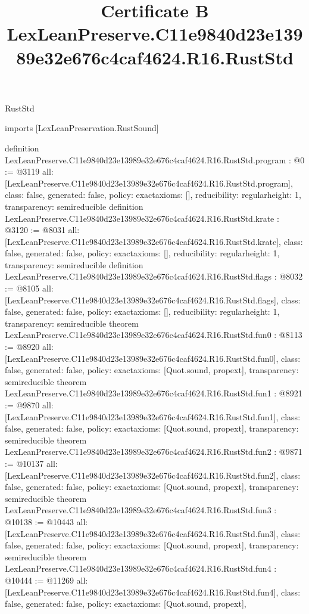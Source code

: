 \begin{lexlean}{RustStd}
\title{Certificate B LexLeanPreserve.C11e9840d23e13989e32e676c4caf4624.R16.RustStd}
\begin{coremodule}
imports [LexLeanPreservation.RustSound]

definition LexLeanPreserve.C11e9840d23e13989e32e676c4caf4624.R16.RustStd.program : @0 := @3119 {
  all: [LexLeanPreserve.C11e9840d23e13989e32e676c4caf4624.R16.RustStd.program],
  class: false,
  generated: false,
  policy: exact{axioms: []},
  reducibility: regular{height: 1},
  transparency: semireducible
}
definition LexLeanPreserve.C11e9840d23e13989e32e676c4caf4624.R16.RustStd.krate : @3120 := @8031 {
  all: [LexLeanPreserve.C11e9840d23e13989e32e676c4caf4624.R16.RustStd.krate],
  class: false,
  generated: false,
  policy: exact{axioms: []},
  reducibility: regular{height: 1},
  transparency: semireducible
}
definition LexLeanPreserve.C11e9840d23e13989e32e676c4caf4624.R16.RustStd.flags : @8032 := @8105 {
  all: [LexLeanPreserve.C11e9840d23e13989e32e676c4caf4624.R16.RustStd.flags],
  class: false,
  generated: false,
  policy: exact{axioms: []},
  reducibility: regular{height: 1},
  transparency: semireducible
}
theorem LexLeanPreserve.C11e9840d23e13989e32e676c4caf4624.R16.RustStd.fun0 : @8113 := @8920 {
  all: [LexLeanPreserve.C11e9840d23e13989e32e676c4caf4624.R16.RustStd.fun0],
  class: false,
  generated: false,
  policy: exact{axioms: [Quot.sound, propext]},
  transparency: semireducible
}
theorem LexLeanPreserve.C11e9840d23e13989e32e676c4caf4624.R16.RustStd.fun1 : @8921 := @9870 {
  all: [LexLeanPreserve.C11e9840d23e13989e32e676c4caf4624.R16.RustStd.fun1],
  class: false,
  generated: false,
  policy: exact{axioms: [Quot.sound, propext]},
  transparency: semireducible
}
theorem LexLeanPreserve.C11e9840d23e13989e32e676c4caf4624.R16.RustStd.fun2 : @9871 := @10137 {
  all: [LexLeanPreserve.C11e9840d23e13989e32e676c4caf4624.R16.RustStd.fun2],
  class: false,
  generated: false,
  policy: exact{axioms: [Quot.sound, propext]},
  transparency: semireducible
}
theorem LexLeanPreserve.C11e9840d23e13989e32e676c4caf4624.R16.RustStd.fun3 : @10138 := @10443 {
  all: [LexLeanPreserve.C11e9840d23e13989e32e676c4caf4624.R16.RustStd.fun3],
  class: false,
  generated: false,
  policy: exact{axioms: [Quot.sound, propext]},
  transparency: semireducible
}
theorem LexLeanPreserve.C11e9840d23e13989e32e676c4caf4624.R16.RustStd.fun4 : @10444 := @11269 {
  all: [LexLeanPreserve.C11e9840d23e13989e32e676c4caf4624.R16.RustStd.fun4],
  class: false,
  generated: false,
  policy: exact{axioms: [Quot.sound, propext]},
}
\end{coremodule}
\end{lexlean}
